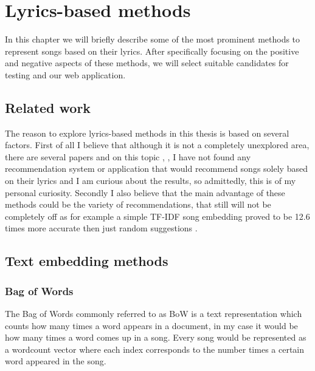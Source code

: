 \chapter{Lyrics-based methods}
 In this chapter we will briefly describe some of the most prominent methods to represent songs based on their lyrics. After specifically focusing on the positive and negative aspects of these methods, we will select suitable candidates for testing and our web application.
\section{Related work}
The reason to explore lyrics-based methods in this thesis is based on several factors. First of all I believe that although it is not a completely unexplored area, there are several papers and on this topic \cite{Gossi2016LyricBasedMR}, \cite{DBLP:journals/corr/Tsaptsinos17}, \cite{inproceedings} I have not found any recommendation system or application that would recommend songs solely based on their lyrics and I am curious about the results, so admittedly, this is of my personal curiosity. Secondly I also believe that the main advantage of these methods could be the variety of recommendations, that still will not be completely off as for example a simple TF-IDF song embedding proved to be 12.6 times more accurate then just random suggestions \cite{Gossi2016LyricBasedMR}.

\section{Text embedding methods}
\subsection{Bag of Words}
The Bag of Words commonly referred to as BoW is a text representation which counts how many times a word appears in a document, in my  case it would be how many times a word comes up in a song.
Every song would be represented as a wordcount vector where each index corresponds to the number times a certain word appeared in the song. 
